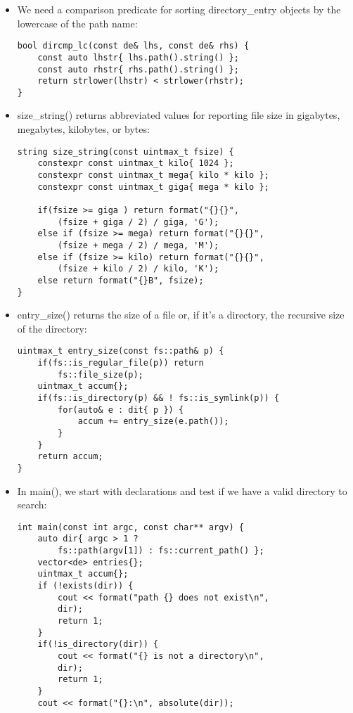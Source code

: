 \begin{itemize}
\item 
We need a comparison predicate for sorting directory\_entry objects by the lowercase of the path name:

\begin{lstlisting}[style=styleCXX]
bool dircmp_lc(const de& lhs, const de& rhs) {
	const auto lhstr{ lhs.path().string() };
	const auto rhstr{ rhs.path().string() };
	return strlower(lhstr) < strlower(rhstr);
}
\end{lstlisting}

\item 
size\_string() returns abbreviated values for reporting file size in gigabytes, megabytes, kilobytes, or bytes:

\begin{lstlisting}[style=styleCXX]
string size_string(const uintmax_t fsize) {
	constexpr const uintmax_t kilo{ 1024 };
	constexpr const uintmax_t mega{ kilo * kilo };
	constexpr const uintmax_t giga{ mega * kilo };
	
	if(fsize >= giga ) return format("{}{}",
		(fsize + giga / 2) / giga, 'G');
	else if (fsize >= mega) return format("{}{}",
		(fsize + mega / 2) / mega, 'M');
	else if (fsize >= kilo) return format("{}{}",
		(fsize + kilo / 2) / kilo, 'K');
	else return format("{}B", fsize);
}
\end{lstlisting}

\item 
entry\_size() returns the size of a file or, if it's a directory, the recursive size of the directory:

\begin{lstlisting}[style=styleCXX]
uintmax_t entry_size(const fs::path& p) {
	if(fs::is_regular_file(p)) return
		fs::file_size(p);
	uintmax_t accum{};
	if(fs::is_directory(p) && ! fs::is_symlink(p)) {
		for(auto& e : dit{ p }) {
			accum += entry_size(e.path());
		}
	}
	return accum;
}
\end{lstlisting}

\item 
In main(), we start with declarations and test if we have a valid directory to search:

\begin{lstlisting}[style=styleCXX]
int main(const int argc, const char** argv) {
	auto dir{ argc > 1 ?
		fs::path(argv[1]) : fs::current_path() };
	vector<de> entries{};
	uintmax_t accum{};
	if (!exists(dir)) {
		cout << format("path {} does not exist\n",
		dir);
		return 1;
	}
	if(!is_directory(dir)) {
		cout << format("{} is not a directory\n",
		dir);
		return 1;
	}
	cout << format("{}:\n", absolute(dir));
\end{lstlisting}


\end{itemize}
